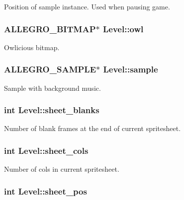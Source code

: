 Position of sample instance. Used when pausing game. \hypertarget{structLevel_af504e3f628040bc2a2913a50253e856d}{
\subsubsection[{owl}]{\setlength{\rightskip}{0pt plus 5cm}A\-L\-L\-E\-G\-R\-O\-\_\-\-B\-I\-T\-M\-A\-P$\ast$ Level\-::owl}}\label{structLevel_af504e3f628040bc2a2913a50253e856d}
Owlicious bitmap. \hypertarget{structLevel_a234fa7b9ec35dd360e4e3c48a944fc7d}{
\subsubsection[{sample}]{\setlength{\rightskip}{0pt plus 5cm}A\-L\-L\-E\-G\-R\-O\-\_\-\-S\-A\-M\-P\-L\-E$\ast$ Level\-::sample}}\label{structLevel_a234fa7b9ec35dd360e4e3c48a944fc7d}
Sample with background music. \hypertarget{structLevel_aebaaba311e5d4842fdbd8c50edd40808}{
\subsubsection[{sheet\-\_\-blanks}]{\setlength{\rightskip}{0pt plus 5cm}int Level\-::sheet\-\_\-blanks}}\label{structLevel_aebaaba311e5d4842fdbd8c50edd40808}
Number of blank frames at the end of current spritesheet. \hypertarget{structLevel_a8a5c443169a4ff15f330a65473eedb1b}{
\subsubsection[{sheet\-\_\-cols}]{\setlength{\rightskip}{0pt plus 5cm}int Level\-::sheet\-\_\-cols}}\label{structLevel_a8a5c443169a4ff15f330a65473eedb1b}
Number of cols in current spritesheet. \hypertarget{structLevel_a21c699af201ffe60ccd1319b3f540947}{
\subsubsection[{sheet\-\_\-pos}]{\setlength{\rightskip}{0pt plus 5cm}int Level\-::sheet\-\_\-pos}}\label{structLevel_a21c699af201ffe60ccd1319b3f540947}
